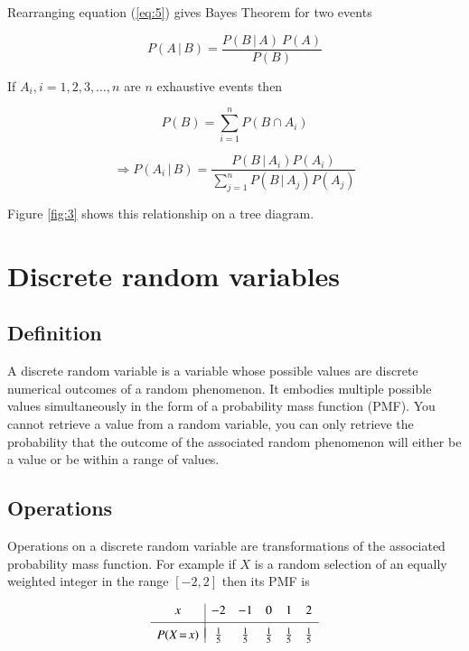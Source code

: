 \documentclass[a5paper]{article}
\begin{document}
Rearranging equation (\ref{eq:5}) gives Bayes Theorem for two events

\begin{equation}
  P(A\,|\,B) = \frac{P(B\,|\,A)\ P(A)}{P(B)}
\end{equation}

\noindent If $A_i, i = 1, 2, 3, \ldots, n$ are $n$ exhaustive events then

\begin{equation}
  P(B) = \sum_{i=1}^{n} P(B\cap A_i)
\end{equation}

\begin{equation}
  \Rightarrow P(A_i\,|\,B) = \frac{P(B\,|\,A_i) P(A_i)}{\sum\limits_{j=1}^{n}P(B\,|\,A_j) P(A_j)}
\end{equation}

\noindent Figure \ref{fig:3} shows this relationship on a tree diagram.

\section{Discrete random variables}

\subsection{Definition}

A discrete random variable is a variable whose possible values are discrete
numerical outcomes of a random phenomenon. It embodies multiple possible values
simultaneously in the form of a probability mass function (PMF). You cannot
retrieve a value from a random variable, you can only retrieve the probability
that the outcome of the associated random phenomenon will either be a value or
be within a range of values.

\subsection{Operations}

Operations on a discrete random variable are transformations of the associated
probability mass function. For example if $X$ is a random selection of an
equally weighted integer in the range $[-2, 2]$ then its PMF is

\begin{equation}
  \begin{array}{c|ccccc}
    x & -2 & -1 & 0 & 1 & 2 \\[3pt]
    \hline \\[-8pt]
    P(X\!=\!x) & \frac{1}{5} & \frac{1}{5} & \frac{1}{5} & \frac{1}{5} & \frac{1}{5}
  \end{array}
\end{equation}
\end{document}
